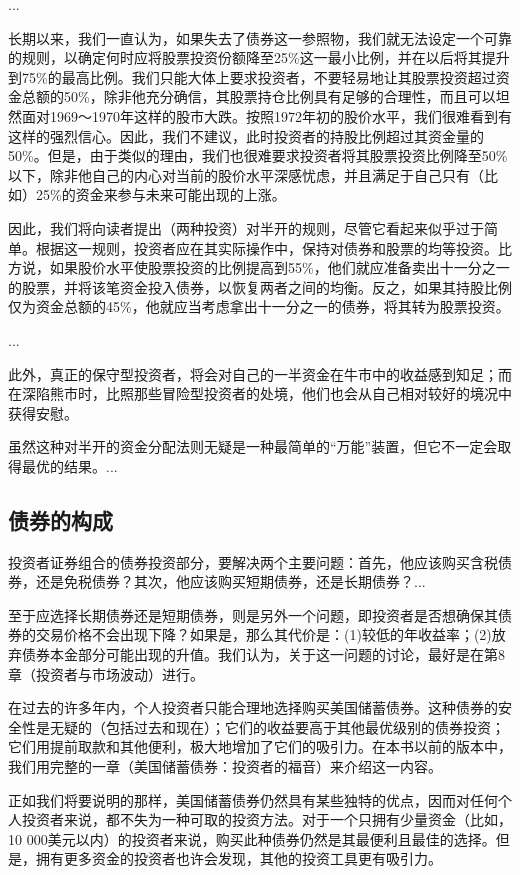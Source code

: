 \documentclass[12pt,oneside]{book}
\begin{document}
...

长期以来，我们一直认为，如果失去了债券这一参照物，我们就无法设定一个可靠的规则，以确定何时应将股票投资份额降至25\%这一最小比例，并在以后将其提升到75\%的最高比例。我们只能大体上要求投资者，不要轻易地让其股票投资超过资金总额的50\%，除非他充分确信，其股票持仓比例具有足够的合理性，而且可以坦然面对1969～1970年这样的股市大跌。按照1972年初的股价水平，我们很难看到有这样的强烈信心。因此，我们不建议，此时投资者的持股比例超过其资金量的50\%。但是，由于类似的理由，我们也很难要求投资者将其股票投资比例降至50\%以下，除非他自己的内心对当前的股价水平深感忧虑，并且满足于自己只有（比如）25\%的资金来参与未来可能出现的上涨。

因此，我们将向读者提出（两种投资）对半开的规则，尽管它看起来似乎过于简单。根据这一规则，投资者应在其实际操作中，保持对债券和股票的均等投资。比方说，如果股价水平使股票投资的比例提高到55\%，他们就应准备卖出十一分之一的股票，并将该笔资金投入债券，以恢复两者之间的均衡。反之，如果其持股比例仅为资金总额的45\%，他就应当考虑拿出十一分之一的债券，将其转为股票投资。

...

此外，真正的保守型投资者，将会对自己的一半资金在牛市中的收益感到知足；而在深陷熊市时，比照那些冒险型投资者的处境，他们也会从自己相对较好的境况中获得安慰。

虽然这种对半开的资金分配法则无疑是一种最简单的“万能”装置，但它不一定会取得最优的结果。...


\subsection{债券的构成}
投资者证券组合的债券投资部分，要解决两个主要问题：首先，他应该购买含税债券，还是免税债券？其次，他应该购买短期债券，还是长期债券？...

至于应选择长期债券还是短期债券，则是另外一个问题，即投资者是否想确保其债券的交易价格不会出现下降？如果是，那么其代价是：(1)较低的年收益率；(2)放弃债券本金部分可能出现的升值。我们认为，关于这一问题的讨论，最好是在第8章（投资者与市场波动）进行。

在过去的许多年内，个人投资者只能合理地选择购买美国储蓄债券。这种债券的安全性是无疑的（包括过去和现在）；它们的收益要高于其他最优级别的债券投资；它们用提前取款和其他便利，极大地增加了它们的吸引力。在本书以前的版本中，我们用完整的一章（美国储蓄债券：投资者的福音）来介绍这一内容。

正如我们将要说明的那样，美国储蓄债券仍然具有某些独特的优点，因而对任何个人投资者来说，都不失为一种可取的投资方法。对于一个只拥有少量资金（比如，10 000美元以内）的投资者来说，购买此种债券仍然是其最便利且最佳的选择。但是，拥有更多资金的投资者也许会发现，其他的投资工具更有吸引力。
\end{document}
